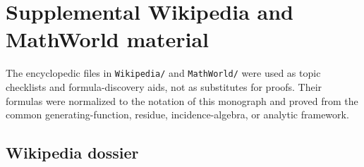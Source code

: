 \documentclass[11pt,a4paper,oneside,openany]{book}
\theoremstyle{definition}
\theoremstyle{remark}
\begin{document}
\chapter{Supplemental Wikipedia and MathWorld material}
\label{ch:merged-reference-concordance}

The encyclopedic files in \nolinkurl{Wikipedia/} and \nolinkurl{MathWorld/}
were used as topic checklists and formula-discovery aids, not as substitutes for
proofs.  Their formulas were normalized to the notation of this monograph and
proved from the common generating-function, residue, incidence-algebra, or
analytic framework.

\section{Wikipedia dossier}
\end{document}
